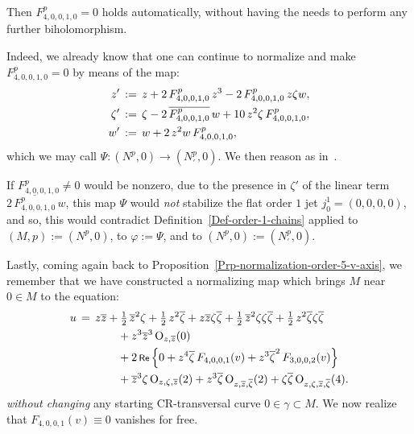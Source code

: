 \documentclass[12pt,twoside,leqno,openany]{amsart}
\begin{document}
\begin{Assertion}
\label{Assertion-F-40010-zero}
Then $F_{4,0,0,1,0}^p = 0$ holds automatically, without
having the needs to perform any further biholomorphism.
\end{Assertion}

\proof
Indeed, we already know that one can continue to normalize
and make $F_{4,0,0,1,0}^p = 0$ by means of the map:
\[
\aligned
z'
&
\,:=\,
z
+
2\,F_{4,0,0,1,0}^p\,z^3
-
2\,F_{4,0,0,1,0}^p\,z\zeta w,
\\
\zeta'
&
\,:=\,
\zeta
-
2\,\overline{F_{4,0,0,1,0}^p}\,
w
+
10\,z^2\zeta\,
F_{4,0,0,1,0}^p,
\\
w'
&
\,:=\,
w
+
2\,z^2w\,
F_{4,0,0,1,0}^p,
\endaligned
\]
which we may call $\Psi \colon (N^p, 0) \longrightarrow
(N_\prime^p, 0)$.
We then reason as in~{\cite[9.5]{Merker-2020}}.

If $F_{4,0,0,1,0}^p \neq 0$ would be nonzero, due to the
presence in $\zeta'$ of the linear term 
$2\, \overline{F_{4,0,0,1,0}^p}\, w$, 
this map $\Psi$ would {\sl not} stabilize the flat order $1$ jet
$j_0^1 = (0, 0, 0, 0)$, and so,
this would contradict
Definition~{\ref{Def-order-1-chains}} applied
to $(M,p) := (N^p, 0)$, to $\varphi := \Psi$,
and to $(N^p, 0) := (N_\prime^p, 0)$.
\endproof

Lastly, coming again back to
Proposition~{\ref{Prp-normalization-order-5-v-axis}}, 
we remember that we have constructed a normalizing map
which brings $M$ near $0 \in M$ to the equation:
\[
\aligned
u
&
\,=\,
z\overline{z}
+
\tfrac{1}{2}\,\overline{z}^2\zeta
+
\tfrac{1}{2}\,z^2\overline{\zeta}
+
z\overline{z}\zeta\overline{\zeta}
+
\tfrac{1}{2}\,\overline{z}^2\zeta\zeta\overline{\zeta}
+
\tfrac{1}{2}\,z^2\overline{\zeta}\zeta\overline{\zeta}
\\
&
\ \ \ \ \ \ \ \ \ \ \ 
+
z^3\overline{z}^3\,
{\rm O}_{z,\overline{z}}(0)
\\
&
\ \ \ \ \ \ \ \ \ \ \ 
+
2\,\Re\,
\Big\{
0
+
z^4\overline{\zeta}\,
F_{4,0,0,1}(v)
+
z^3\overline{\zeta}^2\,
F_{3,0,0,2}(v)
\Big\}
\\
&
\ \ \ \ \ \ \ \ \ \ \ 
+
\overline{z}^3\zeta\,
{\rm O}_{z,\zeta,\overline{z}}(2)
+
z^3\overline{\zeta}\,
{\rm O}_{z,\overline{z},\overline{\zeta}}(2)
+
\zeta\overline{\zeta}\,
{\rm O}_{z,\zeta,\overline{z},\overline{\zeta}}(4).
\endaligned
\]
{\em without changing} any starting CR-transversal curve 
$0 \in \gamma \subset M$. We now realize that $F_{4,0,0,1}(v)
\equiv 0$
vanishes for free.
\end{document}
